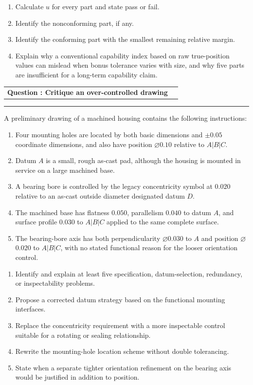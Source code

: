 \documentclass[11pt,a4paper]{article}
\makeatletter
\newcommand{\dia}{\ensuremath{\varnothing}}
\newcommand{\leveltag}[1]{%
  \fcolorbox{navy}{softgray}{\strut\small\bfseries\color{navy}#1}%
}
\newcommand{\qhead}[2]{%
  \clearpage
  \noindent\begin{tabularx}{\linewidth}{@{}Xr@{}}
  {\Large\bfseries\color{navy}Question \thequestion: #1} & \leveltag{#2}
  \end{tabularx}\par\vspace{-1mm}
  \noindent\rule{\linewidth}{0.6pt}\par\vspace{1mm}
}
\newcounter{question}
\newcommand{\question}[2]{\stepcounter{question}\qhead{#1}{#2}}
\makeatother
\begin{document}
\begin{enumerate}[label=(\alph*)]
\item Calculate $u$ for every part and state pass or fail.
\item Identify the nonconforming part, if any.
\item Identify the conforming part with the smallest remaining relative margin.
\item Explain why a conventional capability index based on raw true-position values can mislead when bonus tolerance varies with size, and why five parts are insufficient for a long-term capability claim.
\end{enumerate}

\question{Critique an over-controlled drawing}{Level III}

A preliminary drawing of a machined housing contains the following instructions:

\begin{enumerate}[label=\arabic*.,leftmargin=8mm,itemsep=1pt]
\item Four mounting holes are located by both basic dimensions and $\pm0.05$ coordinate dimensions, and also have position \dia$0.10$ relative to $A|B|C$.
\item Datum $A$ is a small, rough as-cast pad, although the housing is mounted in service on a large machined base.
\item A bearing bore is controlled by the legacy concentricity symbol at $0.020$ relative to an as-cast outside diameter designated datum $D$.
\item The machined base has flatness $0.050$, parallelism $0.040$ to datum $A$, and surface profile $0.030$ to $A|B|C$ applied to the same complete surface.
\item The bearing-bore axis has both perpendicularity \dia$0.030$ to $A$ and position \dia$0.020$ to $A|B|C$, with no stated functional reason for the looser orientation control.
\end{enumerate}

\begin{enumerate}[label=(\alph*)]
\item Identify and explain at least five specification, datum-selection, redundancy, or inspectability problems.
\item Propose a corrected datum strategy based on the functional mounting interfaces.
\item Replace the concentricity requirement with a more inspectable control suitable for a rotating or sealing relationship.
\item Rewrite the mounting-hole location scheme without double tolerancing.
\item State when a separate tighter orientation refinement on the bearing axis would be justified in addition to position.
\end{enumerate}
\end{document}
